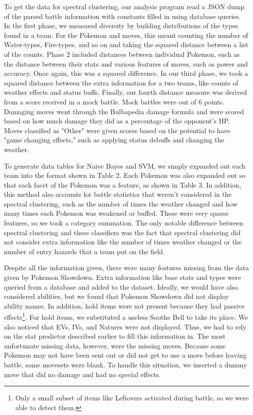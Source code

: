 \documentclass{acm_proc_article-sp}
\begin{document}
To get the data for spectral clustering, our analysis program read a JSON dump of the parsed battle information with constants filled in using database queries. In the first phase, we measured diversity by building distributions of the types found in a team. For the Pokemon and moves, this meant counting the number of Water-types, Fire-types, and so on and taking the squared distance between a list of the counts. Phase 2 included distances between individual Pokemon, such as the distance between their stats and various features of moves, such as power and accuracy. Once again, this was a squared difference. In our third phase, we took a squared distance between the extra information for a two teams, like counts of weather effects and status buffs. Finally, our fourth distance measure was derived from a score received in a mock battle. Mock battles were out of 6 points. Damaging moves went through the Bulbapedia damage formula and were scored based on how much damage they did as a percentage of the opponent's HP. Moves classified as "Other" were given scores based on the potential to have "game changing effects," such as applying status debuffs and changing the weather.

To generate data tables for Naive Bayes and SVM, we simply expanded out each team into the format shown in Table 2. Each Pokemon was also expanded out so that each facet of the Pokemon was a feature, as shown in Table 3. In addition, this method also accounts for battle statistics that weren't considered in the spectral clustering, such as the number of times the weather changed and how many times each Pokemon was weakened or buffed. These were very sparse features, so we took a category summation. The only notable difference between spectral clustering and these classifiers was the fact that spectral clustering did not consider extra information like the number of times weather changed or the number of entry hazards that a team put on the field.

Despite all the information given, there were many features missing from the data given by Pokemon Showdown. Extra information like base stats and types were queried from a database and added to the dataset. Ideally, we would have also considered abilities, but we found that Pokemon Showdown did not display ability names. In addition, hold items were not present because they had passive effects\footnote{Only a small subset of items like Leftovers activated during battle, so we were able to detect them.}. For hold items, we substituted a useless Soothe Bell to take its place. We also noticed that EVs, IVs, and Natures were not displayed. Thus, we had to rely on the stat predictor described earlier to fill this information in. The most unfortunate missing data, however, were the missing moves. Because some Pokemon may not have been sent out or did not get to use a move before leaving battle, some movesets were blank. To handle this situation, we inserted a dummy move that did no damage and had no special effects.
\end{document}
